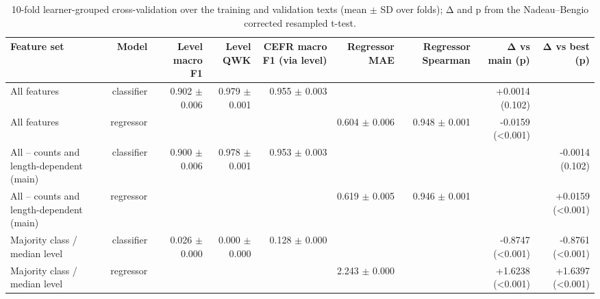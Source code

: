 \begin{table}[t]
\centering
\small
\begin{tabular}{lrrrrrrrr}
\toprule
Feature set & Model & Level macro F1 & Level QWK & CEFR macro F1 (via level) & Regressor MAE & Regressor Spearman & Δ vs main (p) & Δ vs best (p) \\
\midrule
All features & classifier & 0.902 $\pm$ 0.006 & 0.979 $\pm$ 0.001 & 0.955 $\pm$ 0.003 &  &  & +0.0014 (0.102) &  \\
All features & regressor &  &  &  & 0.604 $\pm$ 0.006 & 0.948 $\pm$ 0.001 & -0.0159 (<0.001) &  \\
All -- counts and length-dependent (main) & classifier & 0.900 $\pm$ 0.006 & 0.978 $\pm$ 0.001 & 0.953 $\pm$ 0.003 &  &  &  & -0.0014 (0.102) \\
All -- counts and length-dependent (main) & regressor &  &  &  & 0.619 $\pm$ 0.005 & 0.946 $\pm$ 0.001 &  & +0.0159 (<0.001) \\
Majority class / median level & classifier & 0.026 $\pm$ 0.000 & 0.000 $\pm$ 0.000 & 0.128 $\pm$ 0.000 &  &  & -0.8747 (<0.001) & -0.8761 (<0.001) \\
Majority class / median level & regressor &  &  &  & 2.243 $\pm$ 0.000 &  & +1.6238 (<0.001) & +1.6397 (<0.001) \\
\bottomrule
\end{tabular}
\caption{10-fold learner-grouped cross-validation over the training and validation texts (mean $\pm$ SD over folds); Δ and p from the Nadeau–Bengio corrected resampled t-test.}
\label{tab:table_4_cross_validation}
\end{table}

